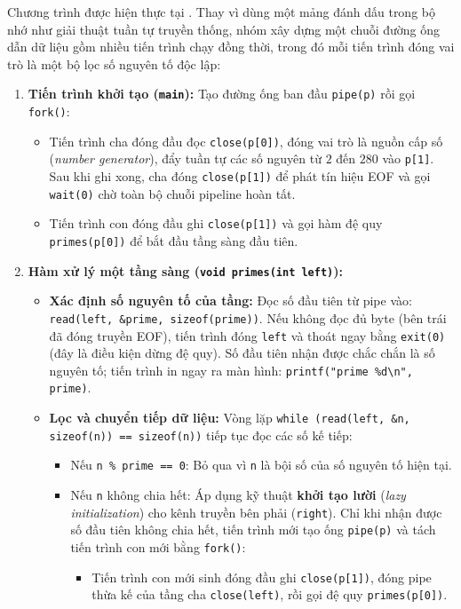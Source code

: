 \documentclass[12pt,a4paper]{article}
\begin{document}
Chương trình được hiện thực tại . Thay vì dùng một mảng đánh dấu trong bộ nhớ như giải thuật tuần tự truyền thống, nhóm xây dựng một chuỗi đường ống dẫn dữ liệu gồm nhiều tiến trình chạy đồng thời, trong đó mỗi tiến trình đóng vai trò là một bộ lọc số nguyên tố độc lập:
\begin{enumerate}
  \item \textbf{Tiến trình khởi tạo (\texttt{main}):} Tạo đường ống ban đầu \texttt{pipe(p)} rồi gọi \texttt{fork()}:
  \begin{itemize}
    \item Tiến trình cha đóng đầu đọc \texttt{close(p[0])}, đóng vai trò là nguồn cấp số (\textit{number generator}), đẩy tuần tự các số nguyên từ $2$ đến $280$ vào \texttt{p[1]}. Sau khi ghi xong, cha đóng \texttt{close(p[1])} để phát tín hiệu EOF và gọi \texttt{wait(0)} chờ toàn bộ chuỗi pipeline hoàn tất.
    \item Tiến trình con đóng đầu ghi \texttt{close(p[1])} và gọi hàm đệ quy \texttt{primes(p[0])} để bắt đầu tầng sàng đầu tiên.
  \end{itemize}
  \item \textbf{Hàm xử lý một tầng sàng (\texttt{void primes(int left)}):}
  \begin{itemize}
    \item \textbf{Xác định số nguyên tố của tầng:} Đọc số đầu tiên từ pipe vào: \texttt{read(left, \&prime, sizeof(prime))}. Nếu không đọc đủ byte (bên trái đã đóng truyền EOF), tiến trình đóng \texttt{left} và thoát ngay bằng \texttt{exit(0)} (đây là điều kiện dừng đệ quy). Số đầu tiên nhận được chắc chắn là số nguyên tố; tiến trình in ngay ra màn hình: \texttt{printf("prime \%d\textbackslash n", prime)}.
    \item \textbf{Lọc và chuyển tiếp dữ liệu:} Vòng lặp \texttt{while (read(left, \&n, sizeof(n)) == sizeof(n))} tiếp tục đọc các số kế tiếp:
    \begin{itemize}
      \item Nếu \texttt{n \% prime == 0}: Bỏ qua vì \texttt{n} là bội số của số nguyên tố hiện tại.
      \item Nếu \texttt{n} không chia hết: Áp dụng kỹ thuật \textbf{khởi tạo lười} (\textit{lazy initialization}) cho kênh truyền bên phải (\texttt{right}). Chỉ khi nhận được số đầu tiên không chia hết, tiến trình mới tạo ống \texttt{pipe(p)} và tách tiến trình con mới bằng \texttt{fork()}:
      \begin{itemize}
        \item Tiến trình con mới sinh đóng đầu ghi \texttt{close(p[1])}, đóng pipe thừa kế của tầng cha \texttt{close(left)}, rồi gọi đệ quy \texttt{primes(p[0])}.

\end{itemize}
\end{itemize}
\end{itemize}
\end{enumerate}
\end{document}
